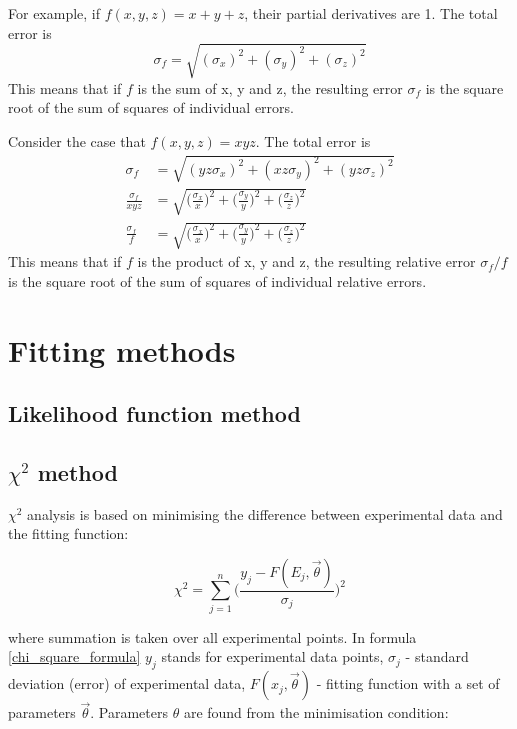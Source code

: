 \documentclass[12pt,a4paper]{report}
\begin{document}
For example, if $f(x,y,z) = x+y+z$, their partial derivatives are 1. The total error is
\begin{equation}
\sigma_{f} = \sqrt{( \sigma_x )^2 + ( \sigma_y )^2+ ( \sigma_z )^2}
\end{equation}
 This means that if $f$ is the sum of x, y and z, the resulting error $\sigma_{f}$ is the square root of the sum of squares of individual errors.
 
Consider the case that $f(x,y,z) = xyz$. The total error is
\begin{align}
\sigma_{f} &= \sqrt{( yz \sigma_x )^2 + ( xz \sigma_y )^2+ ( yz \sigma_z )^2} \\
\frac{ \sigma_{f} }{xyz} &= \sqrt{ \Big( \frac{\sigma_x}{x} \Big)^2 + \Big( \frac{\sigma_y}{y} \Big)^2 + \Big( \frac{\sigma_z}{z} \Big)^2} \\
\frac{ \sigma_{f} }{f} &= \sqrt{ \Big( \frac{\sigma_x}{x} \Big)^2 + \Big( \frac{\sigma_y}{y} \Big)^2 + \Big( \frac{\sigma_z}{z} \Big)^2}
\end{align}
This means that if $f$ is the product of x, y and z, the resulting relative error $\sigma_{f}/f$ is the square root of the sum of squares of individual relative errors.

\section{Fitting methods}
\subsection{Likelihood function method}

\subsection{$\chi^2$ method}

$\chi^2$ analysis \cite{stat_2, BAKER1984437, reduced_chi_squared} is based on minimising the difference between experimental data and the fitting function:

\begin{equation} \label{chi_square_formula}
\chi^2 = \sum_{j = 1}^{n} \Big ( \frac{y_j - F(E_j,\vec{\theta})}{\sigma_j} \Big )^2 
\end{equation}

where summation is taken over all experimental points. In formula \ref{chi_square_formula} $y_j$ stands for experimental data points, $\sigma_j$ - standard deviation (error) of experimental data, $F(x_j,\vec{\theta})$ - fitting function with a set of parameters $\vec{\theta}$. Parameters $\theta$ are found from the minimisation condition:
\end{document}
